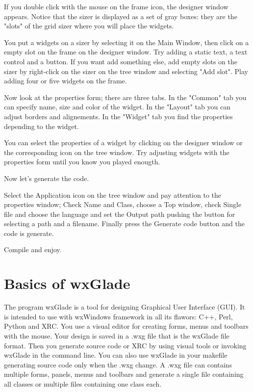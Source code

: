 \documentclass[a4paper,10pt]{report}
\begin{document}
If you double click with the mouse on the frame icon, the designer
window appears.
Notice that the sizer is displayed as a set of gray boxes: they are
the "slots" of the grid sizer where you will place the widgets.

You put a widgets on a sizer by selecting it on the Main Window,
then click on a empty slot on the frame on the designer window.
Try adding a static text, a text control and a button.
If you want add something else, add empty slots on the sizer by
right-click on the sizer on the tree window and selecting "Add slot".
Play adding four or five widgets on the frame.

Now look at the properties form; there are three tabs. In the "Common"
tab you can specify name, size and color of the widget.
In the "Layout" tab you can adjust borders and alignements.
In the "Widget" tab you find the properties depending to the
widget.

You can select the properties of a widget by clicking on the designer window
or the corresponding icon on the tree window.
Try adjusting widgets with the properties form until you know you
played enougth.

Now let's generate the code.

Select the Application icon on the tree window and
pay attention to the properties window;
Check Name and Class, choose a Top window, check Single file and
choose the language
and set the Output path pushing the button for selecting a path and a filename.
Finally press the Generate code button and the code is generate.

Compile and enjoy.


\section{Basics of wxGlade}

The program wxGlade is a tool for designing Graphical User Interface (GUI).
It is intended to use with wxWindows framework in all its flawors: C++, Perl, 
Python and XRC.
You use a visual editor for creating forms, menus and toolbars with the mouse.
Your design is saved in a .wxg file that is the wxGlade file format.
Then you generate source code or XRC by using visual tools or invoking wxGlade 
in the command line.
You can also use wxGlade in your makefile generating source code only when the .wxg
change.
A .wxg file can contains multiple forms, panels, menus and toolbars and generate 
a single file containing all classes or multiple files containing one class each.
\end{document}

